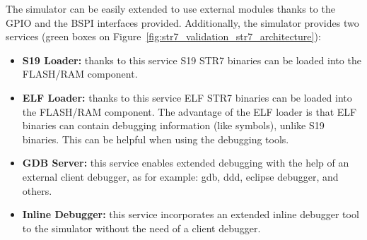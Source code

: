 The simulator can be easily extended to use external modules thanks to the GPIO and the BSPI interfaces provided.
Additionally, the simulator provides two services (green boxes on Figure~\ref{fig:str7_validation_str7_architecture}):
\begin{itemize}
	\item \textbf{S19 Loader:} thanks to this service S19 STR7 binaries can be loaded into the FLASH/RAM component.
	\item \textbf{ELF Loader:} thanks to this service ELF STR7 binaries can be loaded into the FLASH/RAM component. The advantage of the ELF loader is that ELF binaries can contain debugging information (like symbols), unlike S19 binaries. This can be helpful when using the debugging tools.
	\item \textbf{GDB Server:} this service enables extended debugging with the help of an external client debugger, as for example: gdb, ddd, eclipse debugger, and others.
	\item \textbf{Inline Debugger:} this service incorporates an extended inline debugger tool to the simulator without the need of a client debugger.
\end{itemize}


